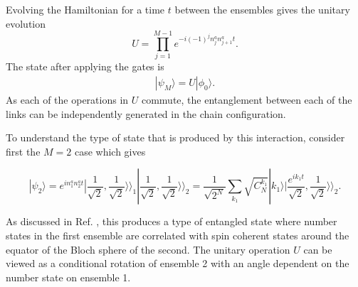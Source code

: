 \documentclass{WileyMSP-template}
\begin{document}
Evolving the Hamiltonian for a time $ t $ between the ensembles gives the unitary evolution
%
\begin{equation}
U=\prod^{M-1}_{j=1} e^{- i (-1)^j  n^a_j n^a_{j+1} t} .
\label{uevol}
\end{equation}
%
The state after applying the gates is
%
\begin{align}
|\psi_M \rangle = U | \phi_0 \rangle .
\end{align}
%
As each of the operations in  $ U $ commute, the entanglement between each of the links can be independently generated in the chain configuration. 


To understand the type of state that is produced by this interaction, consider first the $ M = 2$ case which gives

%
\begin{equation}
|\psi_2 \rangle=e^{i n^a_1 n^a_{2} t}|\frac{1}{\sqrt{2}},\frac{1}{\sqrt{2}}\rangle\rangle_{1}|\frac{1}{\sqrt{2}},\frac{1}{\sqrt{2}}\rangle\rangle_{2} = \frac{1}{\sqrt{2^N}}\sum_{k_1}\sqrt{C_{N}^{k_1}}|k_1\rangle |\frac{e^{i k_1 t} }{\sqrt{2}},\frac{1}{\sqrt{2}}\rangle\rangle_2 .
\label{M2psi}
\end{equation}
%

As discussed in Ref. \cite{byrnes2013fractality}, this produces a type of entangled state where number states in the first ensemble are correlated with spin coherent states around the equator of the Bloch sphere of the second. The unitary operation $U $ can be viewed as a conditional rotation of ensemble 2 with an angle dependent on the number state on ensemble 1.



%



\end{document}
